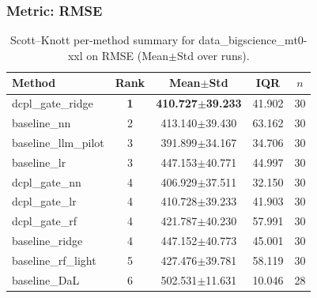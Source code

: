 \subsubsection*{Metric: RMSE}
\begin{table}[H]
\centering
\scriptsize
\setlength{\tabcolsep}{4pt}
\renewcommand{\arraystretch}{1.1}
\caption{Scott--Knott per-method summary for data\_bigscience\_mt0-xxl on RMSE (Mean$\pm$Std over runs).}
\label{tab:sk_data_bigscience_mt0-xxl_RMSE}
\begin{tabular}{l|c|c|c|c}
\hline
\textbf{Method} & \textbf{Rank} & \textbf{Mean$\pm$Std} & \textbf{IQR} & \textbf{$n$} \\
\hline
\rowcolor{red!15} dcpl\_gate\_ridge & \textbf{1} & \textbf{410.727$\pm$39.233} & 41.902 & 30 \\
baseline\_nn & 2 & 413.140$\pm$39.430 & 63.162 & 30 \\
baseline\_llm\_pilot & 3 & 391.899$\pm$34.167 & 34.706 & 30 \\
baseline\_lr & 3 & 447.153$\pm$40.771 & 44.997 & 30 \\
dcpl\_gate\_nn & 4 & 406.929$\pm$37.511 & 32.150 & 30 \\
dcpl\_gate\_lr & 4 & 410.728$\pm$39.233 & 41.903 & 30 \\
dcpl\_gate\_rf & 4 & 421.787$\pm$40.230 & 57.991 & 30 \\
baseline\_ridge & 4 & 447.152$\pm$40.773 & 45.001 & 30 \\
baseline\_rf\_light & 5 & 427.476$\pm$39.781 & 58.119 & 30 \\
baseline\_DaL & 6 & 502.531$\pm$11.631 & 10.046 & 28 \\
\hline
\end{tabular}
\end{table}

